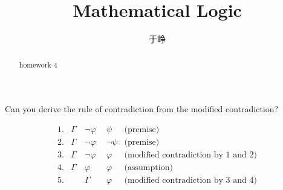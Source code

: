 \documentclass{ximera}
\begin{document}
\title{Mathematical Logic}
\author{于峥}

\begin{abstract}
    homework 4
\end{abstract}
\maketitle

\begin{problem}
    Can you derive the rule of contradiction from the modified contradiction?
    \begin{solution}
        $$
            \begin{aligned}
                1. &\Gamma ~ &\neg\varphi ~~ &\psi      &\text{(premise)}\\
                2. &\Gamma ~ &\neg\varphi ~~ &\neg\psi  &\text{(premise)}\\
                3. &\Gamma ~ &\neg\varphi ~~ &\varphi   &\text{(modified contradiction by 1 and 2)}\\
                4. &\Gamma ~ &\varphi     ~~ &\varphi   &\text{(assumption)}\\
                5. &       ~ &\Gamma      ~~ &\varphi   &\text{(modified contradiction by 3 and 4)}
            \end{aligned}
        $$
    \end{solution}
\end{problem}
\end{document}
